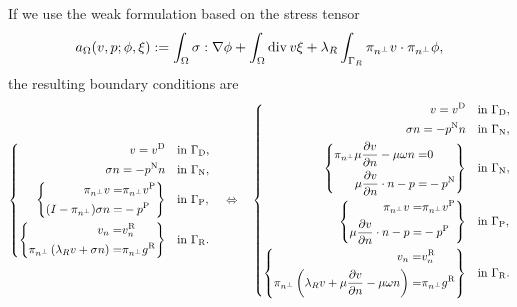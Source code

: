 \begin{proposition}\label{prop:}
If we use the weak formulation based on the stress tensor
%
\begin{equation}\label{eq:}
a_{\Omega}(v,p; \phi,\xi) := \int_{\Omega} \sigma:\nabla\phi + \int_{\Omega} \operatorname{div} v \xi
+ \lambda_R\int_{\Gamma_R}\pi_{n^{\perp}} v\cdot\pi_{n^{\perp}} \phi,
\end{equation}
%
the resulting boundary conditions are 
%
\begin{equation}\label{eq:stokes:bccauchy}
%
\begin{aligned}
%
\left\{
\begin{aligned}
v = \vD \quad &\mbox{in $\GammaD$},\\
\sigma n= -\pN n\quad &\mbox{in $\GammaN$},\\
\left\{
\begin{aligned}
\pitang v =& \pitang \vP\\
(I-\pitang) \sigma n  =& -\pP 
\end{aligned}
\right\}
\quad  &\mbox{in $\GammaP$},\\
\left\{
\begin{aligned}
v_n =& \vRn\\
\pitang \left( \lambda_R v + \sigma n\right)  =& \pitang\gR 
\end{aligned}
\right\}
\quad &\mbox{in $\GammaR$}.
\end{aligned}
\right.
%
\quad\Leftrightarrow\quad
\left\{
\begin{aligned}
v = \vD \quad &\mbox{in $\GammaD$},\\
\sigma n= -\pN n\quad &\mbox{in $\GammaN$},\\
\left\{
\begin{aligned}
\pitang \mu \frac{\partial v}{\partial n} - \mu\omega n  =& 0\\
 \mu \frac{\partial v}{\partial n}\cdot n -p   =& -\pN
\end{aligned}
\right\}
\quad &\mbox{in $\GammaN$},\\
\left\{
\begin{aligned}
\pitang v =& \pitang \vP\\
 \mu \frac{\partial v}{\partial n}\cdot n -p   =& -\pP
\end{aligned}
\right\}
\quad &\mbox{in $\GammaP$},\\
\left\{
\begin{aligned}
v_n =& \vRn\\
\pitang \left( \lambda_R v +\mu \dn{v} - \mu\omega n\right)  =& \pitang\gR 
\end{aligned}
\right\}
\quad &\mbox{in $\GammaR$}.
\end{aligned}
\right.
%
\end{aligned}
\end{equation}
%
\end{proposition}
